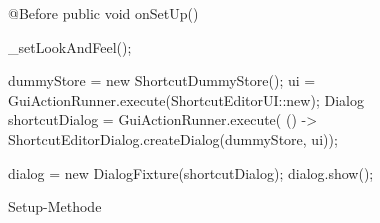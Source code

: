 \begin{wrapfigure}[9]{r}[0px]{322px}
    \centering
	\vspace{-12px}
	\begin{spacing}{0.75}
		\begin{javacode}[firstnumber=27]
@Before
public void onSetUp()
{
  _setLookAndFeel();
  
  dummyStore = new ShortcutDummyStore();
  ui = GuiActionRunner.execute(ShortcutEditorUI::new);
  Dialog shortcutDialog = GuiActionRunner.execute(
      () -> ShortcutEditorDialog.createDialog(dummyStore, ui));
  
  dialog = new DialogFixture(shortcutDialog);
  dialog.show();
}\end{javacode}
	\end{spacing}
	\caption{Setup-Methode}
	\label{fig:Test-ShortcutEditor-onSetUp}
\end{wrapfigure}